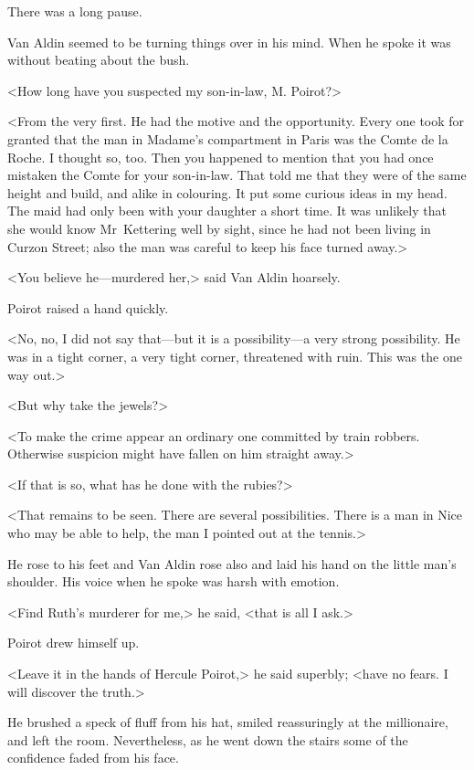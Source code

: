 There was a long pause.

Van Aldin seemed to be turning things over in his mind. When he spoke it was without beating about the bush.

<How long have you suspected my son-in-law, M. Poirot?>

<From the very first. He had the motive and the opportunity. Every one took for granted that the man in Madame's compartment in Paris was the Comte de la Roche. I thought so, too. Then you happened to mention that you had once mistaken the Comte for your son-in-law. That told me that they were of the same height and build, and alike in colouring. It put some curious ideas in my head. The maid had only been with your daughter a short time. It was unlikely that she would know Mr~Kettering well by sight, since he had not been living in Curzon Street; also the man was careful to keep his face turned away.>

<You believe he—murdered her,> said Van Aldin hoarsely.

Poirot raised a hand quickly.

<No, no, I did not say that—but it is a possibility—a very strong possibility. He was in a tight corner, a very tight corner, threatened with ruin. This was the one way out.>

<But why take the jewels?>

<To make the crime appear an ordinary one committed by train robbers. Otherwise suspicion might have fallen on him straight away.>

<If that is so, what has he done with the rubies?>

<That remains to be seen. There are several possibilities. There is a man in Nice who may be able to help, the man I pointed out at the tennis.>

He rose to his feet and Van Aldin rose also and laid his hand on the little man's shoulder. His voice when he spoke was harsh with emotion.

<Find Ruth's murderer for me,> he said, <that is all I ask.>

Poirot drew himself up.

<Leave it in the hands of Hercule Poirot,> he said superbly; <have no fears. I will discover the truth.>

He brushed a speck of fluff from his hat, smiled reassuringly at the millionaire, and left the room. Nevertheless, as he went down the stairs some of the confidence faded from his face.

